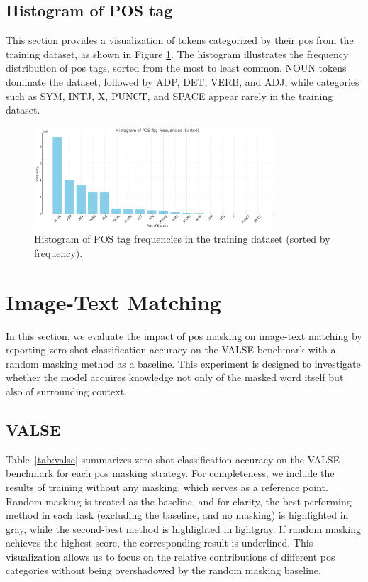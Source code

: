 \subsection{Histogram of POS tag}
This section provides a visualization of tokens categorized by their \acrshort{pos} from the training dataset, as shown in Figure \ref{fig:pos_count}.
The histogram illustrates the frequency distribution of \acrshort{pos} tags, sorted from the most to least common.
NOUN tokens dominate the dataset, followed by ADP, DET, VERB, and ADJ, while categories such as SYM, INTJ, X, PUNCT, and SPACE appear rarely in the training dataset.

\begin{figure}[H]
    \caption{Histogram of POS tag frequencies in the training dataset (sorted by frequency).}
    \label{fig:pos_count}
    \centering
    \includegraphics[width=0.8\textwidth]{Images/graph/pos_count.png}
\end{figure}

\section{Image-Text Matching}
In this section, we evaluate the impact of \acrshort{pos} masking on image-text matching by reporting zero-shot classification accuracy on the VALSE benchmark with a random masking method as a baseline.
This experiment is designed to investigate whether the model acquires knowledge not only of the masked word itself but also of surrounding context.

\subsection{VALSE}
Table~\ref{tab:valse} summarizes zero‐shot classification accuracy on the VALSE benchmark for each \acrshort{pos} masking strategy.
For completeness, we include the results of training without any masking, which serves as a reference point.
Random masking is treated as the baseline, and for clarity, the best-performing method in each task (excluding the baseline, and no masking) is highlighted in gray, while the second-best method is highlighted in lightgray.
If random masking achieves the highest score, the corresponding result is underlined.
This visualization allows us to focus on the relative contributions of different \acrshort{pos} categories without being overshadowed by the random masking baseline.

